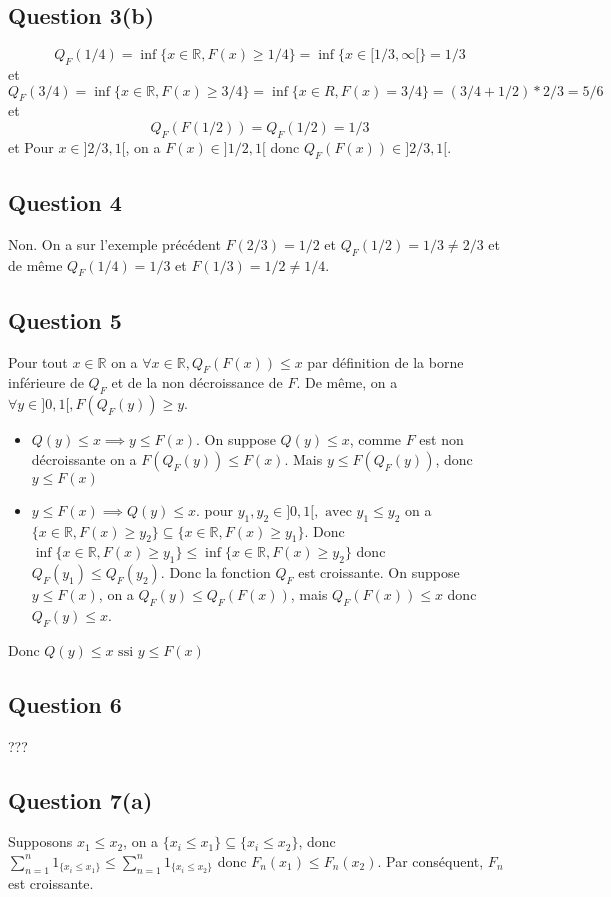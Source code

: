 \documentclass[]{book}
\theoremstyle{definition}
\newcommand{\bb}[1]{\mathbb{#1}}
\newcommand{\R}{\bb{R}}
\begin{document}
\subsection*{Question 3(b)}
$$Q_F(1/4) = \inf\{x \in \R, F(x) \geq 1/4\}= \inf \{ x \in [1/3, \infty[\} = 1/3$$
et
$$Q_F(3/4) = \inf\{x \in \R, F(x) \geq 3/4\}= \inf \{ x \in R, F(x) = 3/4\} = (3/4+1/2)*2/3 = 5/6$$
et
$$Q_F(F(1/2)) = Q_F(1/2) = 1/3$$
et
Pour $x \in ]2/3,1[$, on a $F(x) \in ]1/2,1[$ donc $Q_F(F(x)) \in ]2/3,1[$.

\subsection*{Question 4}
Non. On a sur l'exemple pr\'ec\'edent $F(2/3) = 1/2$ et $Q_F(1/2) = 1/3 \neq 2/3$ et de m\^eme $Q_F(1/4) = 1/3$ et $F(1/3) = 1/2 \neq 1/4$. 

\subsection*{Question 5}
Pour tout $x \in \R$ on a $\forall x \in \R, Q_F(F(x)) \leq x$ par d\'efinition de la borne inf\'erieure de $Q_F$ et de la non d\'ecroissance de $F$. De m\^eme, on a $\forall y \in ]0,1[, F(Q_F(y)) \geq y$. 

\begin{itemize}
\item $Q(y) \leq x \implies y \leq F(x)$. On suppose $Q(y) \leq x$, comme $F$ est non d\'ecroissante on a $F(Q_F(y)) \leq F(x)$. Mais $y \leq F(Q_F(y))$, donc $y \leq F(x)$
\item $y \leq F(x) \implies Q(y) \leq x$. pour $y_1, y_2 \in ]0,1[, \text{ avec } y_1 \leq y_2$ on a $\{x \in \R, F(x) \geq y_2\} \subseteq \{x \in \R, F(x) \geq y_1\}$. 
Donc $\inf \{x \in \R, F(x) \geq y_1\} \leq  \inf \{x \in \R, F(x) \geq y_2\}$ donc $Q_F(y_1) \leq Q_F(y_2)$. Donc la fonction $Q_F$ est croissante. On suppose $y \leq F(x)$, on a $Q_F(y) \leq Q_F(F(x))$, mais $Q_F(F(x)) \leq x$ donc $Q_F(y) \leq x$.
\end{itemize}

Donc $Q(y) \leq x \text{ ssi } y \leq F(x)$

\subsection*{Question 6}
???

\subsection*{Question 7(a)}
Supposons $x_1 \leq x_2$, on a $\{x_i \leq x_1\} \subseteq \{x_i \leq x_2\}$, donc $\sum_{n=1}^n {1_{\{x_i \leq x_1\}}} \leq \sum_{n=1}^n {1_{\{x_i \leq x_2\}}}$ donc $F_n(x_1) \leq F_n(x_2)$. Par cons\'equent, $F_n$ est croissante.
\end{document}
